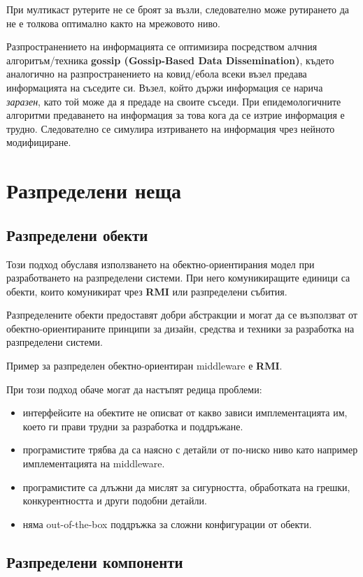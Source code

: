 \documentclass[fleqn,12pt]{article}
\begin{document}
При мултикаст рутерите не се броят за възли, следователно може рутирането да не е толкова оптимално както на мрежовото ниво.
\bigbreak

Разпространението на информацията се оптимизира посредством алчния алгоритъм/техника \textbf{gossip (Gossip-Based Data Dissemination)}, където аналогично на разпространението на ковид/ебола всеки възел предава информацията на съседите си.
Възел, който държи информация се нарича \textit{заразен}, като той може да я предаде на своите съседи.
При епидемологичните алгоритми предаването на информация за това кога да се изтрие информация е трудно.
Следователно се симулира изтриването на информация чрез нейното модифициране.

\section{Разпределени неща}
\subsection{Разпределени обекти}

Този подход обуславя използването на обектно-ориентирания модел при разработването на разпределени системи.
При него комуникиращите единици са обекти, които комуникират чрез \textbf{RMI} или разпределени събития.
\bigbreak

Разпределените обекти предоставят добри абстракции и могат да се възползват от обектно-ориентираните принципи за дизайн, средства и техники за разработка на разпределени системи.
\bigbreak

Пример за разпределен обектно-ориентиран middleware е \textbf{RMI}.
\bigbreak

При този подход обаче могат да настъпят редица проблеми:
\begin{itemize}
    \item интерфейсите на обектите не описват от какво зависи имплементацията им, което ги прави трудни за разработка и поддръжане.
    \item програмистите трябва да са наясно с детайли от по-ниско ниво като например имплементацията на middleware.
    \item програмистите са длъжни да мислят за сигурността, обработката на грешки, конкурентността и други подобни детайли.
    \item няма out-of-the-box поддръжка за сложни конфигурации от обекти.
\end{itemize}

\subsection{Разпределени компоненти}
\end{document}
